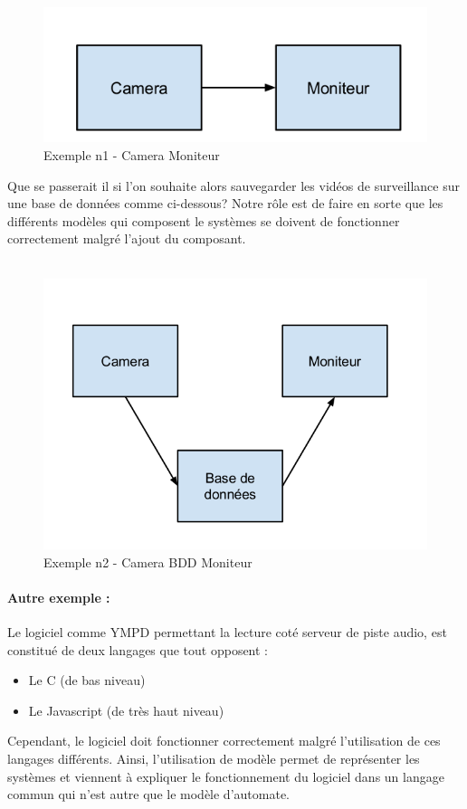 \documentclass[12pt,a4paper]{report}
\begin{document}
\begin{figure}[h]
	\centering
	\includegraphics[scale=0.5]{ressources/camera-moniteur.png}
	\caption{Exemple n1 - Camera Moniteur}
\end{figure}
Que se passerait il si l'on souhaite alors sauvegarder les vidéos de surveillance sur une base de données comme ci-dessous?
Notre rôle est de faire en sorte que les différents modèles qui composent le systèmes se doivent de fonctionner correctement malgré l'ajout du composant. \\\\
\begin{figure}[!h]
	\centering
	\includegraphics[scale=0.5]{ressources/camera-bdd-moniteur.png}
	\caption{Exemple n2 - Camera BDD  Moniteur}
\end{figure}


\paragraph*{Autre exemple :\\}

Le logiciel comme YMPD permettant la lecture coté serveur de piste audio, est constitué de deux langages que tout opposent : \begin{itemize}
  \item Le C (de bas niveau)
  \item Le Javascript (de très haut niveau)
\end{itemize}
Cependant, le logiciel doit fonctionner correctement malgré l'utilisation de ces langages différents. Ainsi, l'utilisation de modèle permet de représenter les systèmes et viennent à expliquer le fonctionnement du logiciel dans un langage commun qui n'est autre que le modèle d'automate.
\end{document}
